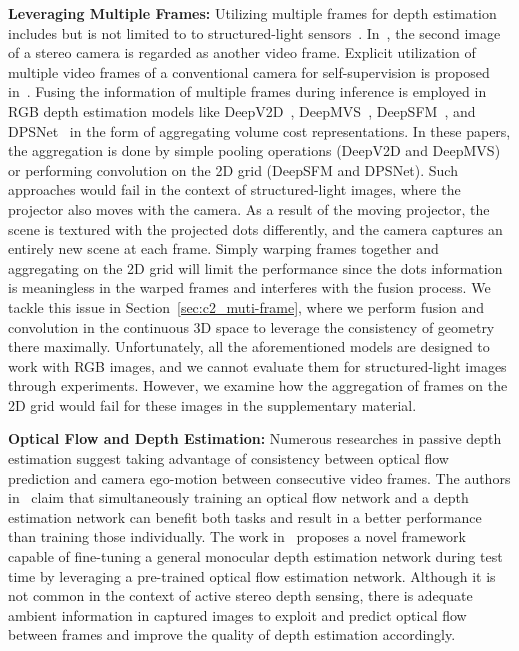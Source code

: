 \bigbreak\noindent\textbf{Leveraging Multiple Frames:} Utilizing multiple frames for depth estimation includes but is not limited to to structured-light sensors~\cite{riegler2019connecting}. In~\cite{godard2017unsupervised, xie2016deep3d, kuznietsov2017semi}, the second image of a stereo camera is regarded as another video frame. Explicit utilization of multiple video frames of a conventional camera for self-supervision is proposed in~\cite{zhan2018unsupervised, zhou2017unsupervised, bian2019unsupervised, godard2019digging, guizilini20203d, pillai2019superdepth, casser2019unsupervised}. Fusing the information of multiple frames during inference is employed in RGB depth estimation models like 
DeepV2D~\cite{teed2019deepv2d}, DeepMVS~\cite{huang2018deepmvs}, DeepSFM~\cite{wei2020deepsfm}, and DPSNet~\cite{im2018dpsnet} in the form of aggregating volume cost representations. In these papers, the aggregation is done by simple pooling operations (DeepV2D and DeepMVS) or performing convolution on the 2D grid (DeepSFM and DPSNet). Such approaches would fail in the context of structured-light images, where the projector also moves with the camera. As a result of the moving projector, the scene is textured with the projected dots differently, and the camera captures an entirely new scene at each frame. Simply warping frames together and aggregating on the 2D grid will limit the performance since the dots information is meaningless in the warped frames and interferes with the fusion process. We tackle this issue in Section~\ref{sec:c2_muti-frame}, where we perform fusion and convolution in the continuous 3D space to leverage the consistency of geometry there maximally. Unfortunately, all the aforementioned models are designed to work with RGB images, and we cannot evaluate them for structured-light images through experiments. However, we examine how the aggregation of frames on the 2D grid would fail for these images in the supplementary material.

\bigbreak\noindent\textbf{Optical Flow and Depth Estimation:} Numerous researches in passive depth estimation suggest taking advantage of consistency between optical flow prediction and camera ego-motion between consecutive video frames. The authors in~\cite{wang2019unos, yin2018geonet, zou2018df, ranjan2019competitive} claim that simultaneously training an optical flow network and a depth estimation network can benefit both tasks and result in a better performance than training those individually. The work in~\cite{luo2020consistent} proposes a novel framework capable of fine-tuning a general monocular depth estimation network during test time by leveraging a pre-trained optical flow estimation network. Although it is not common in the context of active stereo depth sensing, there is adequate ambient information in captured images to exploit and predict optical flow between frames and improve the quality of depth estimation accordingly.

